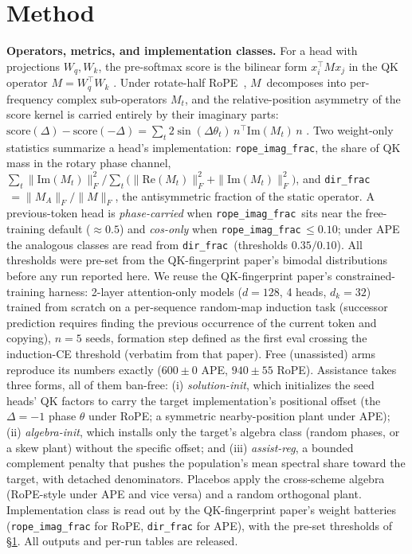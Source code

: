 \documentclass[11pt]{article}
\newcommand{\Rope}{RoPE\xspace}
\newcommand{\M}{\ensuremath{M}\xspace}
\newcommand{\dirfrac}{\texttt{dir\_frac}\xspace}
\newcommand{\rif}{\texttt{rope\_imag\_frac}\xspace}
\newcommand{\Mt}{\ensuremath{M_t}\xspace}
\begin{document}
\section{Method}\label{sec:method}
\textbf{Operators, metrics, and implementation classes.} For a head with projections $W_q,W_k$, the pre-softmax
score is the bilinear form $x_i^\top \M x_j$ in the QK operator $\M=W_q^\top W_k$ \citep{elhage2021framework}.
Under rotate-half \Rope\ \citep{su2021roformer}, \M\ decomposes into per-frequency complex sub-operators \Mt, and
the relative-position asymmetry of the score kernel is carried entirely by their imaginary parts:
$\mathrm{score}(\Delta)-\mathrm{score}(-\Delta)=\sum_t 2\sin(\Delta\theta_t)\,n^\top\mathrm{Im}(\Mt)\,n$
\citep{li2026fingerprint}. Two weight-only statistics summarize a head's implementation: \rif, the share of QK
mass in the rotary phase channel, $\sum_t\|\mathrm{Im}(\Mt)\|_F^2\big/\sum_t\!\big(\|\mathrm{Re}(\Mt)\|_F^2
+\|\mathrm{Im}(\Mt)\|_F^2\big)$, and \dirfrac$\,=\|\M_A\|_F/\|\M\|_F$, the antisymmetric fraction of the static
operator. A previous-token head is \emph{phase-carried} when \rif\ sits near the free-training default
($\approx0.5$) and \emph{cos-only} when \rif$\,\le0.10$; under APE the analogous classes are read from \dirfrac\
(thresholds $0.35/0.10$). All thresholds were pre-set from the QK-fingerprint paper's bimodal distributions before any run
reported here.
We reuse the QK-fingerprint paper's constrained-training harness: 2-layer attention-only models ($d{=}128$, 4 heads,
$d_k{=}32$) trained from scratch on a per-sequence random-map induction task (successor prediction requires
finding the previous occurrence of the current token and copying), $n{=}5$ seeds, formation step defined as the
first eval crossing the induction-CE threshold (verbatim from that paper). Free (unassisted) arms reproduce its
numbers exactly ($600{\pm}0$ APE, $940{\pm}55$ RoPE). Assistance takes three forms, all of them
ban-free: (i) \emph{solution-init}, which initializes the seed heads' QK factors to carry the target
implementation's positional offset (the $\Delta{=}{-}1$ phase $\theta$ under \Rope; a symmetric nearby-position
plant under APE); (ii) \emph{algebra-init}, which installs only the target's algebra class (random phases,
or a skew plant) without the specific offset; and (iii) \emph{assist-reg}, a bounded complement penalty that
pushes the population's mean spectral share toward the target, with detached denominators. Placebos apply the cross-scheme
algebra (RoPE-style under APE and vice versa) and a random orthogonal plant. Implementation class is read out by
the QK-fingerprint paper's weight batteries (\rif for RoPE, \dirfrac for APE), with the pre-set thresholds of
\S\ref{sec:method}. All outputs and per-run tables are released.
\end{document}
